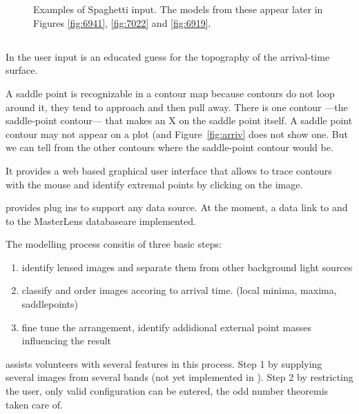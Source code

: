 \begin{figure}
  \centering
   \\
   \\
  \caption{Examples of Spaghetti input.  The models from these appear
    later in Figures \ref{fig:6941}, \ref{fig:7022} and \ref{fig:6919}.
  \label{fig:input-spag}}
\end{figure}

\subsection{\spl} \label{sec:SpaghettiLens}

In \spl the user input is an educated guess for the topography of the
arrival-time surface.

A saddle point is recognizable in a contour map because contours do
not loop around it, they tend to approach and then pull away.  There
is one contour ---the saddle-point contour--- that makes an X on the
saddle point itself.  A saddle point contour may not appear on a plot
(and Figure~\ref{fig:arriv} does not show one.  But we can tell from
the other contours where the saddle-point contour would be.

It provides a web based graphical user interface that allows to trace contours with the mouse and identify extremal points by clicking on the image.

\spl provides plug ins to support any data source. At the moment, a data link to \sw and to the MasterLens database\needcite are implemented.

The modelling process consitis of three basic steps:
\begin{enumerate}
  \item identify lensed images and separate them from other background light sources
  \item classify and order images accoring to arrival time. (local minima, maxima, saddlepoints)
  \item fine tune the arrangement, identify addidional external point masses influencing the result
\end{enumerate}

\spl assists volunteers with several features in this process.
Step 1 by supplying several images from several bands (not yet implemented in \sw).
Step 2 by restricting the user, only valid configuration can be entered, the odd number theorem\needcite is taken care of.



